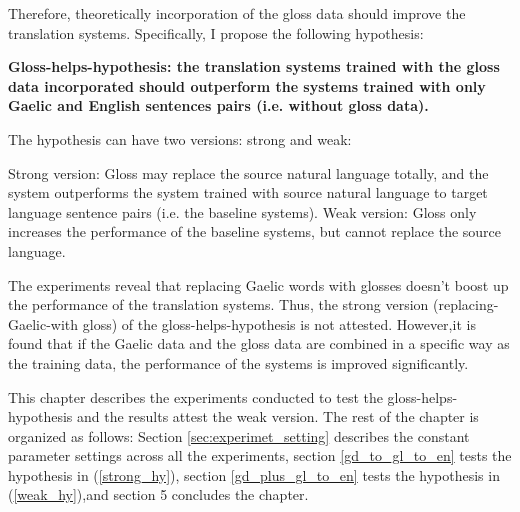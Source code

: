 \documentclass[a4paper]{article}
\begin{document}
Therefore, theoretically incorporation of the gloss data should improve the translation systems. Specifically, I propose the following hypothesis:
\begin{exe}  
\ex \textbf{Gloss-helps-hypothesis: the translation systems trained with the gloss data incorporated should outperform the systems trained with only Gaelic and English sentences pairs (i.e. without gloss data).}

The hypothesis can have two versions: strong and weak:
	\begin{xlist}
	\ex \label{strong_hy} Strong version: Gloss may replace the source natural language totally, and the system outperforms the system trained with source natural language to target language sentence pairs (i.e. the baseline systems).   
	\ex \label{weak_hy} Weak version: Gloss only increases the performance of the baseline systems, but cannot replace the source language. 
	\end{xlist}
\end{exe}

The experiments reveal that replacing Gaelic words with glosses doesn't boost up the performance of the translation systems. Thus, the strong version (replacing-Gaelic-with gloss) of the gloss-helps-hypothesis is not attested. However,it is found that if the Gaelic data and the gloss data are combined in a specific way as the training data, the performance of the systems is improved significantly.  

This chapter describes the experiments conducted to test the gloss-helps-hypothesis and the results attest the weak version. 
The rest of the chapter is organized as follows: Section \ref{sec:experimet_setting} describes the constant parameter settings across all the experiments, section \ref{gd_to_gl_to_en} tests the hypothesis in (\ref{strong_hy}), section \ref{gd_plus_gl_to_en} tests the hypothesis in (\ref{weak_hy}),and section 5 concludes the chapter.  

\end{document}
